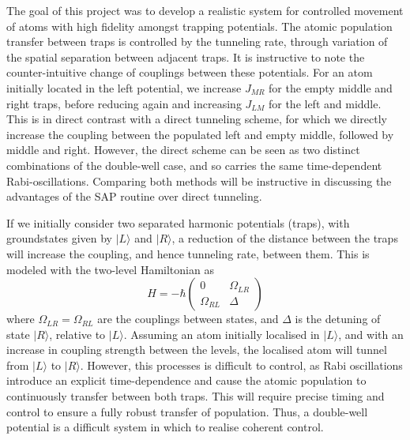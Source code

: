 The goal of this project was to develop a realistic system for controlled movement of atoms with high fidelity amongst trapping potentials. The atomic population transfer between traps is controlled by the tunneling rate, through variation of the spatial separation between adjacent traps. It is instructive to note the counter-intuitive change of couplings between these potentials. For an atom initially located in the left potential, we increase $J_{MR}$ for the empty middle and right traps, before reducing again and increasing $J_{LM}$ for the left and middle. This is in direct contrast with a direct tunneling scheme, for which we directly increase the coupling between the populated left and empty middle, followed by middle and right. However, the direct scheme can be seen as two distinct combinations of the double-well case, and so carries the same time-dependent Rabi-oscillations. Comparing both methods will be instructive in discussing the advantages of the SAP routine over direct tunneling. %

If we initially consider two separated harmonic potentials (traps), with groundstates given by $| L \rangle$ and $| R \rangle$, a reduction of the distance between the traps will increase the coupling, and hence tunneling rate, between them. This is modeled with the two-level Hamiltonian as
\begin{equation}
    H = -\hbar
    \begin{pmatrix}
        0 & \Omega_{LR} \\
        \Omega_{RL} & \Delta
    \end{pmatrix}
\end{equation}
where $\Omega_{LR} = \Omega_{RL}$ are the couplings between states, and $\Delta$ is the detuning of state $| R \rangle$, relative to $| L \rangle$. Assuming an atom initially localised in $| L \rangle$, and with an increase in coupling strength between the levels, the localised atom will tunnel from $| L \rangle$ to $| R \rangle $. However, this processes is difficult to control, as Rabi oscillations introduce an explicit time-dependence and cause the atomic population to continuously transfer between both traps. This will require precise timing and control to ensure a fully robust transfer of population. Thus, a double-well potential is a difficult system in which to realise coherent control.

